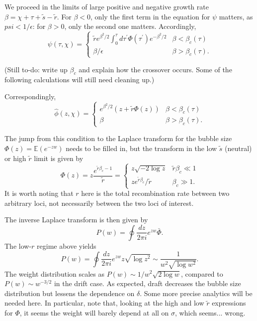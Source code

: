 \documentclass[10pt]{revtex4}
\begin{document}
We proceed in the limits of large positive and negative growth rate $\beta = \chi+\tau+\tilde{s}-\tilde{r}$.
For $\beta < 0$, only the first term in the equation for $\psi$ matters, as $psi < 1/\epsilon$: for $\beta > 0$, only the second one matters.
Accordingly,
\begin{equation}
\psi(\tau,\chi) =
\begin{cases}
\tilde{r} e^{\beta^2/2} \int^\tau_0 d\tau^\prime \Phi(\tau^\prime)e^{-\beta^2/2} & \beta < \beta_c (\tau) \\
\beta/\epsilon & \beta > \beta_c (\tau).
\end{cases}
\end{equation}

(Still to-do: write up $\beta_c$ and explain how the crossover occurs.
Some of the following calculations will still need cleaning up.)

Correspondingly,
\begin{equation}
\hat{\phi}(z,\chi) =
\begin{cases}
e^{\beta^2/2}(z+\tilde{r}\Phi(z)) & \beta < \beta_c (\tau) \\
\beta & \beta > \beta_c (\tau).
\end{cases}
\end{equation}

The jump from this condition to the Laplace transform for the bubble size $\Phi(z) = \mathbb{E}(e^{-zw})$ needs to be filled in, but the transform in the low $\tilde{s}$ (neutral) or high $\tilde{r}$ limit is given by
\begin{equation}
\Phi(z) = z\frac{e^{\tilde{r}\beta_c - 1}}{\tilde{r}} = 
\begin{cases}
z\sqrt{-2\log z} & \tilde{r} \beta_c \ll 1 \\
z e^{\tilde{r}\beta_c}/\tilde{r} & \beta_c \gg 1.
\end{cases}
\end{equation}
It is worth noting that $r$ here is the total recombination rate between two arbitrary loci, not necessarily between the two loci of interest.

The inverse Laplace transform is then given by
\begin{equation}
P(w) = \oint \frac{dz}{2\pi i} e^{zw} \bar{\Phi}.
\end{equation}
The low-$r$ regime above yields
\begin{equation}
P(w) = \oint \frac{dz}{2\pi i} e^{zw}z\sqrt{\log z^2} \sim \frac{1}{w^2\sqrt{\log w^2}}.
\end{equation}
The weight distribution scales as $P(w)\sim 1/w^2 \sqrt{2\log w}$, compared to $P(w) \sim w^{-3/2}$ in the drift case.
As expected, draft decreases the bubble size distribution but lessens the dependence on $\delta$.
Some more precise analytics will be needed here.
In particular, note that, looking at the high and low $\tilde{r}$ expressions for $\Phi$, it seems the weight will barely depend at all on $\sigma$, which seems... wrong.
\end{document}
